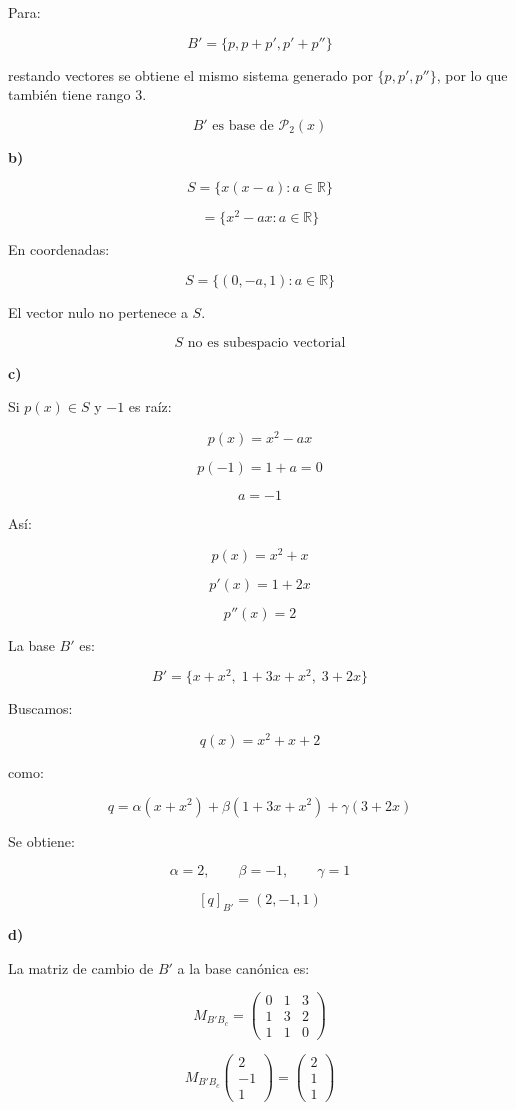 \documentclass[11pt,a4paper]{article}
\newcommand{\R}{\mathbb{R}}
\newcommand{\Pn}{\mathcal{P}}
\begin{document}
	Para:

	\[
	B'=\{p,p+p',p'+p''\}
	\]

	restando vectores se obtiene el mismo sistema generado por $\{p,p',p''\}$, por lo que también tiene rango $3$.

	\[
	\boxed{
	B'\text{ es base de }\Pn_2(x)
	}
	\]

	\textbf{b)}

	\[
	S=
	\{x(x-a):a\in\R\}
	\]

	\[
	=
	\{x^2-ax:a\in\R\}
	\]

	En coordenadas:

	\[
	S=
	\{(0,-a,1):a\in\R\}
	\]

	El vector nulo no pertenece a $S$.

	\[
	\boxed{
	S\text{ no es subespacio vectorial}
	}
	\]

	\textbf{c)}

	Si $p(x)\in S$ y $-1$ es raíz:

	\[
	p(x)=x^2-ax
	\]

	\[
	p(-1)=1+a=0
	\]

	\[
	a=-1
	\]

	Así:

	\[
	p(x)=x^2+x
	\]

	\[
	p'(x)=1+2x
	\]

	\[
	p''(x)=2
	\]

	La base $B'$ es:

	\[
	B'=
	\{x+x^2,\;1+3x+x^2,\;3+2x\}
	\]

	Buscamos:

	\[
	q(x)=x^2+x+2
	\]

	como:

	\[
	q=
	\alpha(x+x^2)
	+
	\beta(1+3x+x^2)
	+
	\gamma(3+2x)
	\]

	Se obtiene:

	\[
	\alpha=2,
	\qquad
	\beta=-1,
	\qquad
	\gamma=1
	\]

	\[
	\boxed{
	[q]_{B'}=(2,-1,1)
	}
	\]

	\textbf{d)}

	La matriz de cambio de $B'$ a la base canónica es:

	\[
	M_{B'B_c}
	=
	\begin{pmatrix}
	0&1&3\\
	1&3&2\\
	1&1&0
	\end{pmatrix}
	\]

	\[
	M_{B'B_c}
	\begin{pmatrix}
	2\\-1\\1
	\end{pmatrix}
	=
	\begin{pmatrix}
	2\\1\\1
	\end{pmatrix}
	\]
\end{document}
